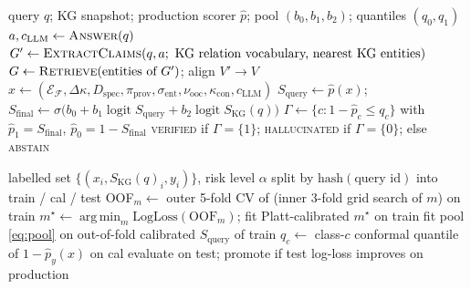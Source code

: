 \documentclass[10pt,twocolumn]{article}
\theoremstyle{remark}
\DeclareMathOperator{\logit}{logit}
\DeclareMathOperator*{\argmin}{arg\,min}
\newcommand{\SKGq}{S_{\mathrm{KG}}(q)}
\begin{document}
\begin{algorithm}[h]
\caption{Audit of one query (inference)}
\begin{algorithmic}[1]
\Require query $q$; KG snapshot; production scorer $\hat p$; pool $(b_0,b_1,b_2)$; quantiles $(q_0,q_1)$
\State $a, c_{\mathrm{LLM}} \gets \textsc{Answer}(q)$ 
\State $G'\gets\textsc{ExtractClaims}(q,a;\ \text{KG relation vocabulary, nearest KG entities})$ 
\State $G\gets\textsc{Retrieve}(\text{entities of }G')$; align $V'\to V$
\State $x\gets(\mathcal E_{\mathcal F},\Delta\kappa,D_{\mathrm{spec}},\pi_{\mathrm{prov}},\sigma_{\mathrm{ent}},\nu_{\mathrm{ooc}},\kappa_{\mathrm{con}},c_{\mathrm{LLM}})$
\State $S_{\mathrm{query}}\gets\hat p(x)$;\quad $S_{\mathrm{final}}\gets\sigma\big(b_0+b_1\logit S_{\mathrm{query}}+b_2\logit\SKGq\big)$
\State $\Gamma\gets\{c:1-\hat p_c\le q_c\}$ with $\hat p_1=S_{\mathrm{final}}$, $\hat p_0=1-S_{\mathrm{final}}$
\State \Return \textsc{verified} if $\Gamma=\{1\}$; \textsc{hallucinated} if $\Gamma=\{0\}$; else \textsc{abstain}
\end{algorithmic}
\end{algorithm}

\begin{algorithm}[h]
\caption{Phase 4 training}
\begin{algorithmic}[1]
\Require labelled set $\{(x_i,\SKGq_i,y_i)\}$, risk level $\alpha$
\State split by $\mathrm{hash}(\text{query id})$ into train / cal / test
  \State OOF$_m\gets$ outer 5-fold CV of (inner 3-fold grid search of $m$) on train
\EndFor
\State $m^\star\gets\argmin_m \mathrm{LogLoss}(\text{OOF}_m)$; fit Platt-calibrated $m^\star$ on train
\State fit pool \cref{eq:pool} on out-of-fold calibrated $S_{\mathrm{query}}$ of train
\State $q_c\gets$ class-$c$ conformal quantile of $1-\hat p_{y}(x)$ on cal
\State evaluate on test; promote if test log-loss improves on production
\end{algorithmic}
\end{algorithm}
\end{document}
